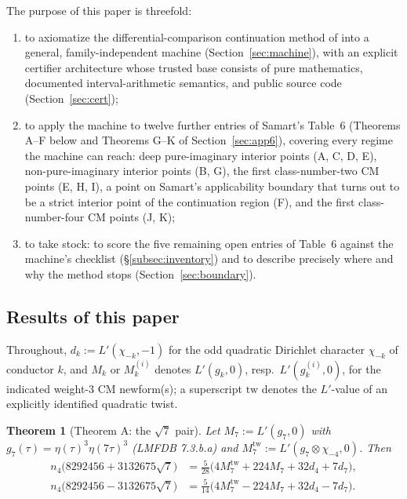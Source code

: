 \documentclass[11pt]{article}
\newtheorem{theorem}{Theorem}[section]
\theoremstyle{definition}
\theoremstyle{remark}
\begin{document}
The purpose of this paper is threefold:
\begin{enumerate}
\item[(i)] to axiomatize the differential-comparison continuation
  method of \cite{Zf} into a general, family-independent machine
  (Section~\ref{sec:machine}), with an explicit certifier architecture
  whose trusted base consists of pure mathematics, documented
  interval-arithmetic semantics, and public source code
  (Section~\ref{sec:cert});
\item[(ii)] to apply the machine to twelve further entries of Samart's
  Table~6 (Theorems A--F below and Theorems G--K of
  Section~\ref{sec:app6}), covering every regime the machine can
  reach:
  deep pure-imaginary interior points (A, C, D, E), non-pure-imaginary
  interior points (B, G), the first class-number-two CM points (E, H, I),
  a point on Samart's applicability boundary that turns out to be a
  strict
  interior point of the continuation region (F), and the first
  class-number-four CM points (J, K);
\item[(iii)] to take stock: to score the five remaining open entries of
  Table~6 against the machine's checklist (\S\ref{subsec:inventory})
  and to describe precisely where and why the method stops
  (Section~\ref{sec:boundary}).
\end{enumerate}

\subsection{Results of this paper}

Throughout, $d_k:=L'(\chi_{-k},-1)$ for the odd quadratic Dirichlet
character $\chi_{-k}$ of conductor $k$, and $M_k$ or $M_k^{(i)}$
denotes $L'(g_k,0)$, resp.\ $L'(g_k^{(i)},0)$, for the indicated
weight-$3$ CM newform(s); a superscript $\mathrm{tw}$ denotes the
$L'$-value of an explicitly identified quadratic twist.

\begin{theorem}[Theorem A: the $\sqrt7$ pair]\label{thm:A}
Let $M_7:=L'(g_7,0)$ with
$g_7(\tau)=\eta(\tau)^3\eta(7\tau)^3$ \textup{(}LMFDB
\textup{\textsf{7.3.b.a}}\textup{)} and
$M_7^{\mathrm{tw}}:=L'(g_7\otimes\chi_{-4},0)$. Then
\begin{align}
n_4\bigl(8292456+3132675\sqrt7\bigr)
  &=\frac{5}{28}\bigl(4M_7^{\mathrm{tw}}+224M_7+32d_4+7d_7\bigr),
    \label{eq:A1}\\
n_4\bigl(8292456-3132675\sqrt7\bigr)
  &=\frac{5}{14}\bigl(4M_7^{\mathrm{tw}}-224M_7+32d_4-7d_7\bigr).
    \label{eq:A2}
\end{align}
\end{theorem}
\end{document}
